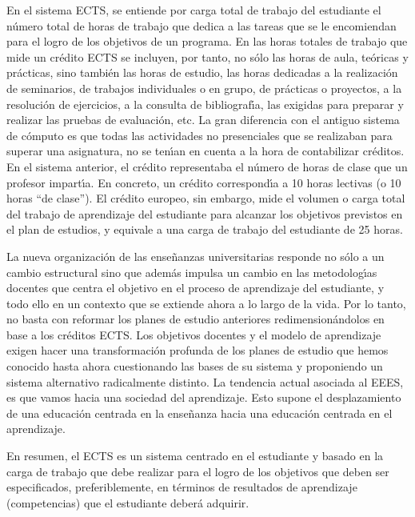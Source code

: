En el sistema ECTS, se entiende por {carga total de trabajo} del estudiante 
el n\'{u}mero total de horas de trabajo que dedica a las tareas que se 
le encomiendan para el logro de los objetivos de un programa. 
En las horas totales de trabajo que mide un cr\'{e}dito ECTS se incluyen,
por tanto, 
no s\'{o}lo las horas de aula, te\'{o}ricas y pr\'{a}cticas, sino 
tambi\'{e}n las horas de estudio, las horas dedicadas a la 
realizaci\'{o}n de seminarios, de trabajos individuales o en grupo, 
de pr\'{a}cticas o proyectos, a la resoluci\'{o}n de ejercicios, 
a la consulta de bibliograf\'{\i}a, las exigidas para preparar 
y realizar las pruebas de evaluaci\'{o}n, etc. 
 La gran diferencia con el antiguo sistema de c\'{o}mputo
 es que todas las actividades no presenciales
 que se realizaban 
para superar una asignatura, no se ten\'{\i}an  en cuenta a 
la hora de contabilizar cr\'{e}ditos.
 En el sistema anterior, el cr\'{e}dito representaba el n\'{u}mero 
de horas de clase que un profesor impart\'{\i}a. En concreto, un cr\'{e}dito
 correspond\'{\i}a a 10 horas lectivas (o 10 horas ``de clase''). 
El cr\'{e}dito europeo, sin embargo, mide el volumen o carga total 
del trabajo de aprendizaje del estudiante para alcanzar los objetivos 
previstos en el plan de estudios, y equivale a una carga de 
trabajo del estudiante de 25 horas.


La nueva organizaci\'{o}n de las ense\~{n}anzas universitarias
responde no s\'{o}lo a un cambio estructural sino
que adem\'{a}s impulsa un cambio en las metodolog\'{\i}as docentes
que centra el objetivo en el proceso de aprendizaje del
estudiante, y todo ello en un contexto que se extiende ahora a lo
largo de la vida.
Por lo tanto, no basta con reformar los planes de estudio anteriores
redimension\'{a}ndolos en base a los cr\'{e}ditos ECTS. Los
objetivos docentes y el modelo de aprendizaje exigen hacer una
transformaci\'{o}n profunda de los planes de estudio que hemos conocido
hasta ahora cuestionando las bases de su  sistema  y proponiendo
un sistema alternativo radicalmente distinto.
La tendencia actual asociada al EEES, es que vamos hacia una sociedad
 del aprendizaje. Esto supone el desplazamiento de una educaci\'{o}n centrada 
en la ense\~{n}anza hacia una educaci\'{o}n centrada en el aprendizaje.

En resumen, el ECTS es un {  sistema centrado en el estudiante}
y basado en la { carga de trabajo} que debe realizar para el logro de 
los objetivos que deben ser especificados, preferiblemente,
en t\'{e}rminos de {  resultados de aprendizaje (competencias)}
 que el estudiante deber\'{a} adquirir.



